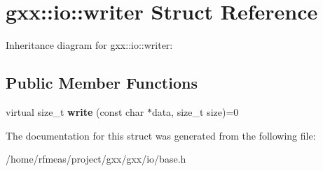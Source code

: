 \hypertarget{structgxx_1_1io_1_1writer}{}\section{gxx\+:\+:io\+:\+:writer Struct Reference}
\label{structgxx_1_1io_1_1writer}


Inheritance diagram for gxx\+:\+:io\+:\+:writer\+:
\subsection*{Public Member Functions}
\begin{DoxyCompactItemize}
\item 
virtual size\+\_\+t {\bfseries write} (const char $\ast$data, size\+\_\+t size)=0\hypertarget{structgxx_1_1io_1_1writer_ac3211fd45144a7452ed241c75dea0ab3}{}\label{structgxx_1_1io_1_1writer_ac3211fd45144a7452ed241c75dea0ab3}

\end{DoxyCompactItemize}


The documentation for this struct was generated from the following file\+:\begin{DoxyCompactItemize}
\item 
/home/rfmeas/project/gxx/gxx/io/base.\+h\end{DoxyCompactItemize}
